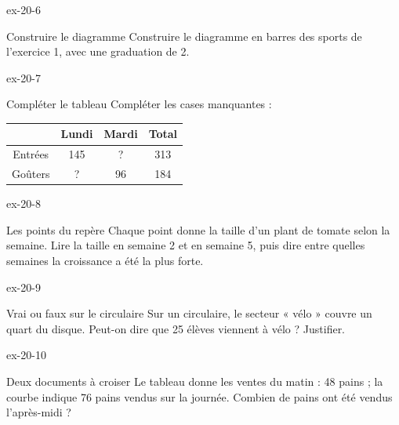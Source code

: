 \begin{blocLivre}{ex-20-6}\begin{exercice}[2]{Construire le diagramme}
Construire le diagramme en barres des sports de l’exercice 1, avec une graduation de 2.
\label{fig-ex-20-6}
\end{exercice}\end{blocLivre}
\begin{blocLivre}{ex-20-7}\begin{exercice}[2]{Compléter le tableau}
Compléter les cases manquantes :\begin{center}\renewcommand{\arraystretch}{1.35}\begin{tabular}{c|ccc}\toprule
 & Lundi & Mardi & Total\\\midrule
Entrées & 145 & ? & 313\\
Goûters & ? & 96 & 184\\
\bottomrule\end{tabular}\end{center}
\end{exercice}\end{blocLivre}
\begin{blocLivre}{ex-20-8}\begin{exercice}[2]{Les points du repère}
Chaque point donne la taille d’un plant de tomate selon la semaine. Lire la taille en semaine 2 et en semaine 5, puis dire entre quelles semaines la croissance a été la plus forte.
\label{fig-ex-20-8}
\end{exercice}\end{blocLivre}
\begin{blocLivre}{ex-20-9}\begin{exercice}[2]{Vrai ou faux sur le circulaire}
Sur un circulaire, le secteur « vélo » couvre un quart du disque. Peut-on dire que 25 élèves viennent à vélo ? Justifier.
\end{exercice}\end{blocLivre}
\begin{blocLivre}{ex-20-10}\begin{exercice}[2]{Deux documents à croiser}
Le tableau donne les ventes du matin : 48 pains ; la courbe indique 76 pains vendus sur la journée. Combien de pains ont été vendus l’après-midi ?
\label{fig-ex-20-10}
\end{exercice}\end{blocLivre}

